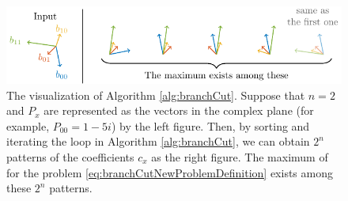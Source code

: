 \documentclass[\main/main]{subfiles}
\begin{document}
\begin{figure}[htbp]
  \centering
  \includegraphics[width=\columnwidth]{imgs/argsort.pdf}
  \caption{
    The visualization of Algorithm \ref{alg:branchCut}.
    Suppose that $n=2$ and $P_x$ are represented as the vectors in the complex plane
    (for example, $P_{00} = 1-5i$) by the left figure.
    Then, by sorting and iterating the loop in Algorithm \ref{alg:branchCut},
    we can obtain $2^n$ patterns of the coefficients $c_x$ as the right figure.
    The maximum of for the problem \eqref{eq:branchCutNewProblemDefinition}
    exists among these $2^n$ patterns.
  }
  \label{fig:argsort}
\end{figure}
\end{document}
